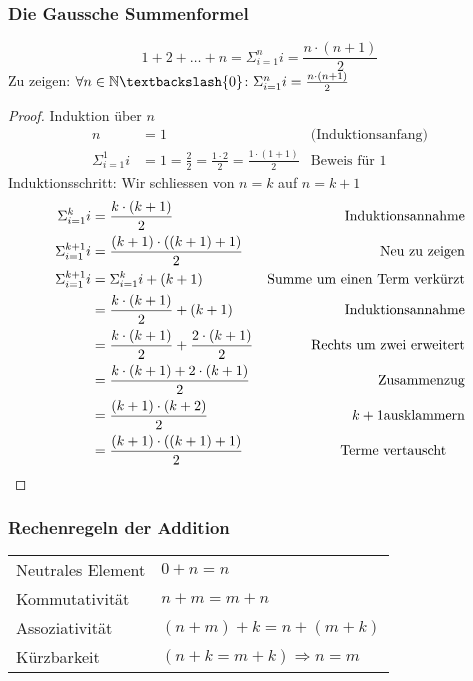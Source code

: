 \subsubsection{Die Gaussche Summenformel}
\begin{equation*}
	1 + 2 + \dots + n = \Sigma_{i = 1}^{n} i = \frac{n \cdot (n+1)}{2}
\end{equation*}
Zu zeigen: $\forall n \in \N\textbackslash\{0\} \colon \Sigma_{i = 1}^n i = \frac{n \cdot (n + 1)}{2}$
\begin{proof}
	Induktion über $n$
	\begin{align*}
		n& = 1 &\mbox{(Induktionsanfang)}\\
		\Sigma_{i=1}^1 i & = 1 = \frac{2}{2} = \frac{1 \cdot 2}{2} = \frac{1 \cdot(1 + 1)}{2} &\mbox{Beweis für 1}
	\end{align*}
	Induktionsschritt: Wir schliessen von $n = k$ auf $n = k + 1$
	\begin{align*}
		\Sigma_{i=1}^k i& = \frac{k \cdot (k + 1)}{2} &\mbox{Induktionsannahme}\\
		\Sigma_{i=1}^{k+1} i& = \frac{(k + 1) \cdot ((k + 1) + 1)}{2} &\mbox{Neu zu zeigen}\\
		\Sigma_{i=1}^{k+1} i& = \Sigma_{i=1}^{k} i + (k + 1)&\mbox{Summe um einen Term verkürzt}\\
		& = \frac{k \cdot (k + 1)}{2} + (k + 1)& \mbox{Induktionsannahme}\\
		& = \frac{k \cdot (k + 1)}{2} + \frac{2 \cdot (k + 1)}{2} & \mbox{Rechts um zwei erweitert}\\
		& = \frac{k \cdot (k + 1) + 2 \cdot (k + 1)}{2}& \mbox{Zusammenzug}\\
		& = \frac{(k + 1) \cdot (k + 2)}{2} & k + 1 \mbox{ausklammern}\\
		& = \frac{(k + 1) \cdot ((k + 1) + 1)}{2} & \mbox{Terme vertauscht~~~~}\qedhere
	\end{align*}
\end{proof}

\subsubsection{Rechenregeln der Addition}
\settowidth{\MyLenA}{Neutrales Element~~}
\begin{tabular}{@{}p{\the\MyLenA}%
				@{}p{}}
	Neutrales Element 		& $0 + n = n$\\
	Kommutativität			& $n + m = m + n$\\
	Assoziativität			& $(n + m) + k = n + (m + k)$\\
	Kürzbarkeit				& $(n + k = m + k) \Rightarrow n = m$\\
\end{tabular}

